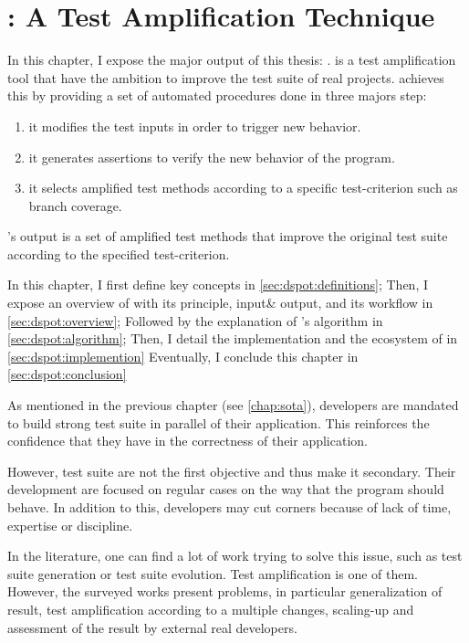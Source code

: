 \chapter{\dspot: A Test Amplification Technique}
\label{chap:dspot}

\begin{chaptersummary}
		In this chapter, I expose the major output of this thesis: \dspot.
		\dspot is a test amplification tool that have the ambition to improve the test suite of real projects.
		\dspot achieves this by providing a set of automated procedures done in three majors step:
		\begin{enumerate}
			\item it modifies the test inputs in order to trigger new behavior.
			\item it generates assertions to verify the new behavior of the program.
			\item it selects amplified test methods according to a specific test-criterion such as branch coverage.
		\end{enumerate}
	
		\dspot's output is a set of amplified test methods that improve the original test suite according to the specified test-criterion.
		
		In this chapter, I first define key concepts in \autoref{sec:dspot:definitions};
		Then, I expose an overview of \dspot with its principle, input\& output, and its workflow in \autoref{sec:dspot:overview};
		Followed by the explanation of \dspot's algorithm in \autoref{sec:dspot:algorithm};
		Then, I detail the implementation and the ecosystem of \dspot in \autoref{sec:dspot:implemention}
		Eventually, I conclude this chapter in \autoref{sec:dspot:conclusion}
\end{chaptersummary}

\minitoc

\graphicspath{{.}{chapitres/dspot/}}

As mentioned in the previous chapter (see \autoref{chap:sota}), developers are mandated to build strong test suite in parallel of their application.
This reinforces the confidence that they have in the correctness of their application.

However, test suite are not the first objective and thus make it secondary.
Their development are focused on regular cases on the way that the program should behave.
In addition to this, developers may cut corners because of lack of time, expertise or discipline.

In the literature, one can find a lot of work trying to solve this issue, such as test suite generation or test suite evolution.
Test amplification is one of them.
However, the surveyed works present problems, in particular generalization of result, test amplification according to a multiple changes, scaling-up and assessment of the result by external real developers.

